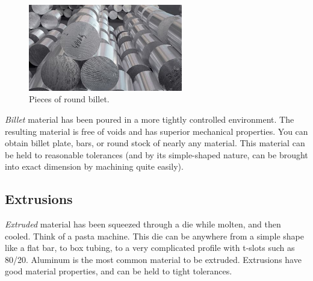 \documentclass[10pt,letterpaper]{book}
\begin{document}
 \begin{figure}[H]
	\includegraphics[width=0.6\textwidth]{imgs/billet.jpeg}
	\caption{Pieces of round billet.}
\end{figure} 
 \textit{Billet} material has been poured in a more tightly controlled environment. The resulting material is free of voids and has superior mechanical properties. You can obtain billet plate, bars, or round stock of nearly any material. This material can be held to reasonable tolerances (and by its simple-shaped nature, can be brought into exact dimension by machining quite easily).
 
 \subsection{Extrusions} \label{section:extrusions}
 \textit{Extruded} material has been squeezed through a die while molten, and then cooled. Think of a pasta machine. This die can be anywhere from a simple shape like a flat bar, to box tubing, to a very complicated profile with t-slots such as 80/20. Aluminum is the most common material to be extruded. Extrusions have good material properties, and can be held to tight tolerances.
 
\end{document}
